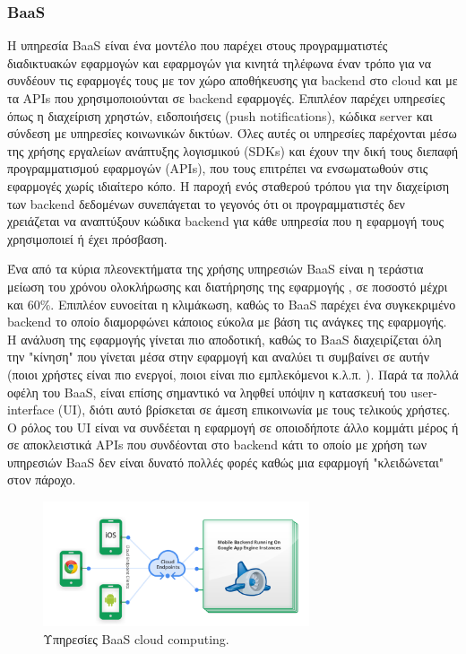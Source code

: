 		\subsubsection{BaaS}
 
	
	Η υπηρεσία BaaS είναι ένα μοντέλο που παρέχει στους προγραμματιστές διαδικτυακών εφαρμογών και εφαρμογών για κινητά τηλέφωνα έναν τρόπο για να συνδέουν τις εφαρμογές τους με τον χώρο αποθήκευσης για backend στο cloud και με τα APIs που χρησιμοποιούνται σε backend εφαρμογές.  Επιπλέον παρέχει υπηρεσίες όπως η διαχείριση χρηστών, ειδοποιήσεις (push notifications), κώδικα server και σύνδεση με υπηρεσίες κοινωνικών δικτύων.  Όλες αυτές οι υπηρεσίες παρέχονται μέσω της χρήσης εργαλείων ανάπτυξης λογισμικού (SDKs) και έχουν την δική τους διεπαφή προγραμματισμού εφαρμογών (APIs), που τους επιτρέπει να ενσωματωθούν στις εφαρμογές χωρίς ιδιαίτερο κόπο. Η παροχή ενός σταθερού τρόπου για την διαχείριση των backend δεδομένων συνεπάγεται το γεγονός ότι οι προγραμματιστές δεν χρειάζεται να αναπτύξουν κώδικα backend για κάθε υπηρεσία που η εφαρμογή τους χρησιμοποιεί ή έχει πρόσβαση.

	Ένα από τα κύρια πλεονεκτήματα της χρήσης υπηρεσιών BaaS είναι η τεράστια μείωση του χρόνου ολοκλήρωσης και διατήρησης της εφαρμογής , σε ποσοστό μέχρι και 60\%. Επιπλέον ευνοείται η κλιμάκωση, καθώς το BaaS παρέχει ένα συγκεκριμένο backend το οποίο διαμορφώνει κάποιος εύκολα με βάση τις ανάγκες της εφαρμογής. Η ανάλυση της εφαρμογής γίνεται πιο αποδοτική, καθώς το BaaS διαχειρίζεται όλη την "κίνηση" που γίνεται μέσα στην εφαρμογή και αναλύει τι συμβαίνει σε αυτήν (ποιοι χρήστες είναι πιο ενεργοί, ποιοι είναι πιο εμπλεκόμενοι κ.λ.π. ). Παρά τα πολλά οφέλη του BaaS, είναι επίσης σημαντικό να ληφθεί υπόψιν η κατασκευή του user-interface (UI), διότι αυτό βρίσκεται σε άμεση επικοινωνία με τους τελικούς χρήστες. Ο ρόλος του UI είναι να συνδέεται η εφαρμογή σε οποιοδήποτε άλλο κομμάτι μέρος ή σε αποκλειστικά APIs που συνδέονται στο backend κάτι το οποίο με χρήση των υπηρεσιών BaaS δεν είναι δυνατό πολλές φορές καθώς μια εφαρμογή "κλειδώνεται" στον πάροχο.
	
		\begin{figure}[h]
	    \centering
	    \includegraphics[width=0.7\textwidth]{BaaS.png}
	    \caption{Υπηρεσίες BaaS cloud computing. }
	    \label{fig:baas}
	\end{figure}

